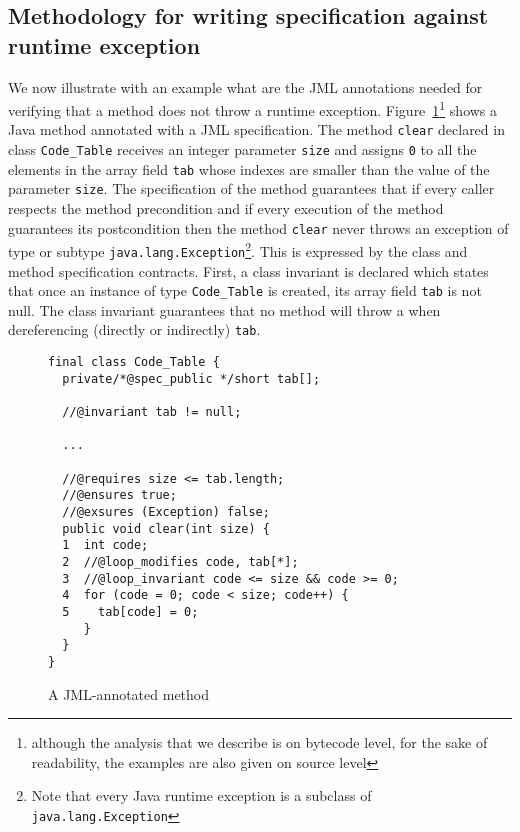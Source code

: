 


\subsection{Methodology for writing specification against runtime exception}

We now illustrate with an example what are the JML annotations needed 
for verifying that a method does not throw  a runtime exception.
 Figure~\ref{fig:jmlexample}\footnote{although the analysis that we describe is on bytecode level, for the sake of readability, the examples are also given on source level}
 shows a Java method annotated with a JML specification. The method \verb!clear! declared in class \verb!Code_Table! receives an integer parameter \verb!size! and assigns \verb!0! to all the elements in the array field \verb!tab! whose indexes are smaller than the value of the parameter \verb!size!. The specification of the method guarantees that if every caller respects the method precondition and if every execution of the method guarantees its postcondition then the method \verb!clear! never throws an exception of type or subtype \verb!java.lang.Exception!\footnote{Note that every Java runtime exception is a subclass of \texttt{java.lang.Exception}}. This is expressed by the class and method specification contracts.
First, a class invariant is declared which states that once an instance of type \verb!Code_Table! is created, its array field \verb!tab! is not null. The class invariant guarantees that no method will throw a \NullPointerExc{} when dereferencing (directly or indirectly) \verb!tab!.

\begin{figure}

\begin{lstlisting}[frame=trbl]
final class Code_Table {
  private/*@spec_public */short tab[];

  //@invariant tab != null;

  ...

  //@requires size <= tab.length;
  //@ensures true;
  //@exsures (Exception) false;
  public void clear(int size) {
  1  int code;
  2  //@loop_modifies code, tab[*];
  3  //@loop_invariant code <= size && code >= 0;
  4  for (code = 0; code < size; code++) {
  5    tab[code] = 0;
     }
  }
}
\end{lstlisting}

\caption{\sc A JML-annotated method}
\label{fig:jmlexample}
\end{figure}

